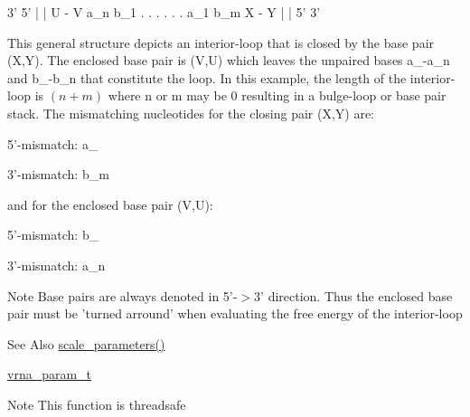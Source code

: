 \begin{DoxyPre}
      3'  5'
      |   |
      U - V
  a\_n       b\_1
   .        .
   .        .
   .        .
  a\_1       b\_m
      X - Y
      |   |
      5'  3'
\end{DoxyPre}
 This general structure depicts an interior-\/loop that is closed by the base pair (X,Y). The enclosed base pair is (V,U) which leaves the unpaired bases a\-\_-\/a\-\_\-n and b\-\_-\/b\-\_\-n that constitute the loop. In this example, the length of the interior-\/loop is $(n+m)$ where n or m may be 0 resulting in a bulge-\/loop or base pair stack. The mismatching nucleotides for the closing pair (X,Y) are\-:\par
 5'-\/mismatch\-: a\-\_\par
 3'-\/mismatch\-: b\-\_\-m\par
 and for the enclosed base pair (V,U)\-:\par
 5'-\/mismatch\-: b\-\_\par
 3'-\/mismatch\-: a\-\_\-n\par
 \begin{DoxyNote}{Note}
Base pairs are always denoted in 5'-\/$>$3' direction. Thus the enclosed base pair must be 'turned arround' when evaluating the free energy of the interior-\/loop 
\end{DoxyNote}
\begin{DoxySeeAlso}{See Also}
\hyperlink{group__energy__parameters_ga541f2cf7436e9bc939b0a49b24baf987}{scale\-\_\-parameters()} 

\hyperlink{group__energy__parameters_ga8a69ca7d787e4fd6079914f5343a1f35}{vrna\-\_\-param\-\_\-t} 
\end{DoxySeeAlso}
\begin{DoxyNote}{Note}
This function is threadsafe
\end{DoxyNote}

